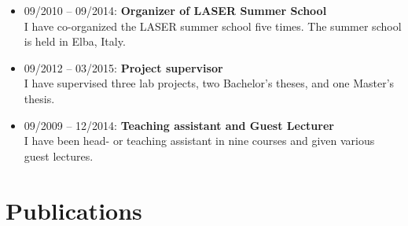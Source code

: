 \begin{itemize}

  \item
  09/2010 -- 09/2014: \textbf{Organizer of LASER Summer School}\\
  I have co-organized the LASER summer school five times. The summer school is held in Elba, Italy.

  \item
  09/2012 -- 03/2015: \textbf{Project supervisor}\\
  I have supervised three lab projects, two Bachelor's theses, and one Master's thesis.

  \item
  09/2009 -- 12/2014: \textbf{Teaching assistant and Guest Lecturer}\\
  I have been head- or teaching assistant in nine courses and given various guest lectures.

\end{itemize}


\section*{Publications}

